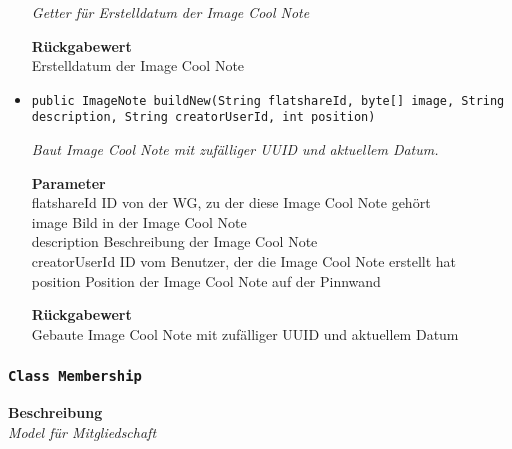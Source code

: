 \begin{itemize}
     	\textit{Getter für Erstelldatum der Image Cool Note}
     	
     	
     	
     	\textbf{Rückgabewert} \\
     	Erstelldatum der Image Cool Note        \item{\texttt{public ImageNote buildNew(String flatshareId, byte[] image, String description, String creatorUserId, int position)}}
     	
     	\textit{Baut Image Cool Note mit zufälliger UUID und aktuellem Datum.}
     	
     	\textbf{Parameter} \\
     	flatshareId ID von der WG, zu der diese Image Cool Note gehört\\
     	image Bild in der Image Cool Note\\
     	description Beschreibung der Image Cool Note\\
     	creatorUserId ID vom Benutzer, der die Image Cool Note erstellt hat\\
     	position Position der Image Cool Note auf der Pinnwand
     	
     	\textbf{Rückgabewert} \\
     	Gebaute Image Cool Note mit zufälliger UUID und aktuellem Datum
     \end{itemize}
     \subsubsection{\texttt{Class Membership}}
     \textbf{Beschreibung} \\
     \textit{Model für Mitgliedschaft}

